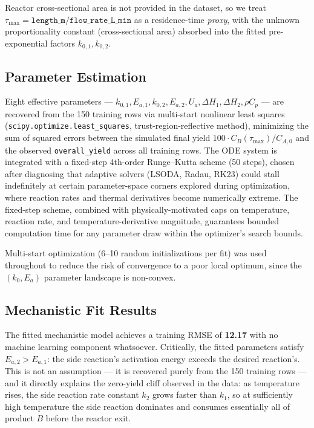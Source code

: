\documentclass[11pt,a4paper]{article}
\begin{document}
Reactor cross-sectional area is not provided in the dataset, so we treat
$\tau_{\max} = \texttt{length\_m} / \texttt{flow\_rate\_L\_min}$ as a residence-time \emph{proxy},
with the unknown proportionality constant (cross-sectional area) absorbed into the fitted
pre-exponential factors $k_{0,1}, k_{0,2}$.

\subsection{Parameter Estimation}

Eight effective parameters --- $k_{0,1}, E_{a,1}, k_{0,2}, E_{a,2}, U_a, \Delta H_1, \Delta H_2,
\rho C_p$ --- are recovered from the 150 training rows via multi-start nonlinear least squares
(\texttt{scipy.optimize.least\_squares}, trust-region-reflective method), minimizing the sum of
squared errors between the simulated final yield $100 \cdot C_B(\tau_{\max}) / C_{A,0}$ and the
observed \texttt{overall\_yield} across all training rows. The ODE system is integrated with a
fixed-step 4th-order Runge--Kutta scheme (50 steps), chosen after diagnosing that adaptive solvers
(LSODA, Radau, RK23) could stall indefinitely at certain parameter-space corners explored during
optimization, where reaction rates and thermal derivatives become numerically extreme. The
fixed-step scheme, combined with physically-motivated caps on temperature, reaction rate, and
temperature-derivative magnitude, guarantees bounded computation time for any parameter draw
within the optimizer's search bounds.

Multi-start optimization (6--10 random initializations per fit) was used throughout to reduce the
risk of convergence to a poor local optimum, since the $(k_0, E_a)$ parameter landscape is
non-convex.

\subsection{Mechanistic Fit Results}
\label{sec:mech-results}

The fitted mechanistic model achieves a training RMSE of \textbf{12.17} with no machine learning
component whatsoever. Critically, the fitted parameters satisfy $E_{a,2} > E_{a,1}$: the side
reaction's activation energy exceeds the desired reaction's. This is not an assumption --- it is
recovered purely from the 150 training rows --- and it directly explains the zero-yield cliff
observed in the data: as temperature rises, the side reaction rate constant $k_2$ grows faster
than $k_1$, so at sufficiently high temperature the side reaction dominates and consumes
essentially all of product $B$ before the reactor exit.
\end{document}
